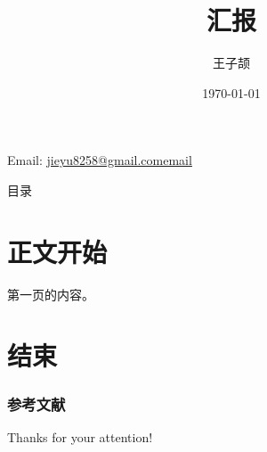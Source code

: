 \documentclass[aspectratio=169]{beamer}
\title{汇报}
\author{王子颉}
\institute{School of Computer and Informatics, HFUT}
\date{\today}
\makeatletter
\newcommand{\contactinfo}{
  \begin{center}
    Email: \href{mailto:jieyu8258@gmail.com}{jieyu8258@gmail.comemail}
  \end{center}
}
\makeatother
\begin{document}
\begin{frame}
	\maketitle
	\contactinfo
\end{frame}

\begin{frame}{目录}
	\tableofcontents
\end{frame}

\section{正文开始}

\begin{frame}
	第一页的内容。
\end{frame}

\section{结束}
\begin{frame}[allowframebreaks]
	\frametitle{参考文献}
	{
		\tiny
		\nocite{*}
		\printbibliography[heading=none]
	}
\end{frame}

\begin{frame}
	\begin{center}
    {\Huge\calligra Thanks for your attention!}
  \end{center}
\end{frame}
\end{document}
